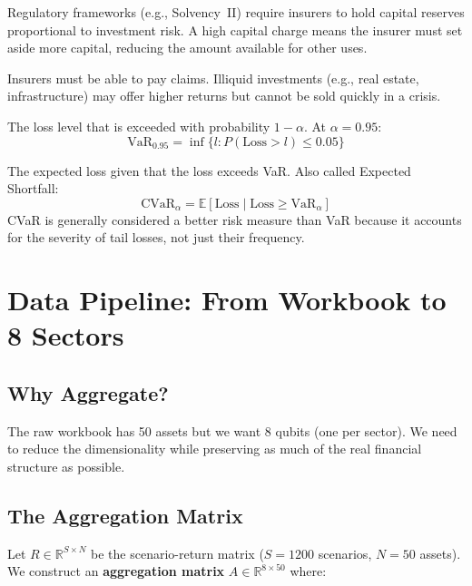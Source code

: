 \documentclass[12pt, a4paper]{article}
\begin{document}
\begin{description}[leftmargin=2cm]
    \item[Capital Charge] Regulatory frameworks (e.g., Solvency~II) require insurers
    to hold capital reserves proportional to investment risk. A high capital charge
    means the insurer must set aside more capital, reducing the amount available
    for other uses.

    \item[Liquidity] Insurers must be able to pay claims. Illiquid investments
    (e.g., real estate, infrastructure) may offer higher returns but cannot be
    sold quickly in a crisis.

    \item[VaR (Value at Risk)] The loss level that is exceeded with probability
    $1 - \alpha$. At $\alpha = 0.95$:
    \[
    \text{VaR}_{0.95} = \inf\{l : P(\text{Loss} > l) \leq 0.05\}
    \]

    \item[CVaR (Conditional Value at Risk)] The expected loss given that the loss
    exceeds VaR. Also called Expected Shortfall:
    \[
    \text{CVaR}_\alpha = \mathbb{E}[\text{Loss} \mid \text{Loss} \geq \text{VaR}_\alpha]
    \]
    CVaR is generally considered a better risk measure than VaR because it
    accounts for the severity of tail losses, not just their frequency.
\end{description}


\section{Data Pipeline: From Workbook to 8 Sectors}

\subsection{Why Aggregate?}

The raw workbook has 50 assets but we want 8 qubits (one per sector). We need
to reduce the dimensionality while preserving as much of the real financial
structure as possible.

\subsection{The Aggregation Matrix}

Let $R \in \mathbb{R}^{S \times N}$ be the scenario-return matrix ($S = 1200$
scenarios, $N = 50$ assets). We construct an \textbf{aggregation matrix}
$A \in \mathbb{R}^{8 \times 50}$ where:
\end{document}
